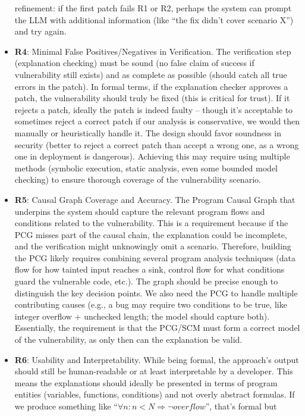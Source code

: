 \documentclass[conference,compsoc]{IEEEtran}
\begin{document}
\begin{itemize}
  refinement: if the first patch fails R1 or R2, perhaps the system can
  prompt the LLM with additional information (like ``the fix didn't
  cover scenario X'') and try again.
\item
  \textbf{R4}: Minimal False Positives/Negatives in Verification. The
  verification step (explanation checking) must be sound (no false claim
  of success if vulnerability still exists) and as complete as possible
  (should catch all true errors in the patch). In formal terms, if the
  explanation checker approves a patch, the vulnerability should truly
  be fixed (this is critical for trust). If it rejects a patch, ideally
  the patch is indeed faulty -- though it's acceptable to sometimes
  reject a correct patch if our analysis is conservative, we would then
  manually or heuristically handle it. The design should favor soundness
  in security (better to reject a correct patch than accept a wrong one,
  as a wrong one in deployment is dangerous). Achieving this may require
  using multiple methods (symbolic execution, static analysis, even some
  bounded model checking) to ensure thorough coverage of the
  vulnerability scenario.
\item
  \textbf{R5}: Causal Graph Coverage and Accuracy. The Program Causal
  Graph that underpins the system should capture the relevant program
  flows and conditions related to the vulnerability. This is a
  requirement because if the PCG misses part of the causal chain, the
  explanation could be incomplete, and the verification might
  unknowingly omit a scenario. Therefore, building the PCG likely
  requires combining several program analysis techniques (data flow for
  how tainted input reaches a sink, control flow for what conditions
  guard the vulnerable code, etc.). The graph should be precise enough
  to distinguish the key decision points. We also need the PCG to handle
  multiple contributing causes (e.g., a bug may require two conditions
  to be true, like integer overflow + unchecked length; the model should
  capture both). Essentially, the requirement is that the PCG/SCM must
  form a correct model of the vulnerability, as only then can the
  explanation be valid.
\item
  \textbf{R6}: Usability and Interpretability. While being formal, the
  approach's output should still be human-readable or at least
  interpretable by a developer. This means the explanations should
  ideally be presented in terms of program entities (variables,
  functions, conditions) and not overly abstract formulas. If we produce
  something like ``$\forall n: n < N \Rightarrow \lnot overflow$'', that's formal but

\end{itemize}
\end{document}
